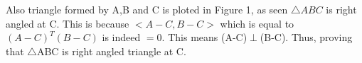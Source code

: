 \documentclass{article}
\begin{document}
 \begin{figure}[!htb]
	\caption{\label{fig1}}
\end{figure}

Also triangle formed by A,B and C is ploted in Figure 1, as seen $\triangle ABC$ is right angled at C. This is because $<A-C, B-C>$ which is equal to $(A-C)^T(B-C) $ is indeed $=0$. This means (A-C)$\perp$(B-C). Thus, proving that $\triangle$ABC is right angled triangle at C.
\end{document}
